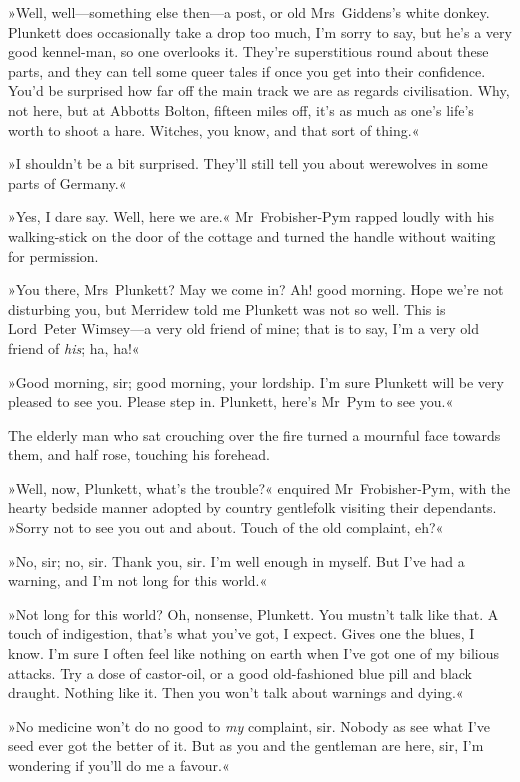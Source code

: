 »Well, well—something else then—a post, or old Mrs~Giddens's white donkey. Plunkett does occasionally take a drop too much, I'm sorry to say, but he's a very good kennel-man, so one overlooks it. They're superstitious round about these parts, and they can tell some queer tales if once you get into their confidence. You'd be surprised how far off the main track we are as regards civilisation. Why, not here, but at Abbotts Bolton, fifteen miles off, it's as much as one's life's worth to shoot a hare. Witches, you know, and that sort of thing.«

»I shouldn't be a bit surprised. They'll still tell you about werewolves in some parts of Germany.«

»Yes, I dare say. Well, here we are.« Mr~Frobisher-Pym rapped loudly with his walking-stick on the door of the cottage and turned the handle without waiting for permission.

»You there, Mrs~Plunkett? May we come in? Ah! good morning. Hope we're not disturbing you, but Merridew told me Plunkett was not so well. This is Lord~Peter Wimsey—a very old friend of mine; that is to say, I'm a very old friend of \textit{his}; ha, ha!«

»Good morning, sir; good morning, your lordship. I'm sure Plunkett will be very pleased to see you. Please step in. Plunkett, here's Mr~Pym to see you.«

The elderly man who sat crouching over the fire turned a mournful face towards them, and half rose, touching his forehead.

»Well, now, Plunkett, what's the trouble?« enquired Mr~Frobisher-Pym, with the hearty bedside manner adopted by country gentlefolk visiting their dependants. »Sorry not to see you out and about. Touch of the old complaint, eh?«

»No, sir; no, sir. Thank you, sir. I'm well enough in myself. But I've had a warning, and I'm not long for this world.«

»Not long for this world? Oh, nonsense, Plunkett. You mustn't talk like that. A touch of indigestion, that's what you've got, I expect. Gives one the blues, I know. I'm sure I often feel like nothing on earth when I've got one of my bilious attacks. Try a dose of castor-oil, or a good old-fashioned blue pill and black draught. Nothing like it. Then you won't talk about warnings and dying.«

»No medicine won't do no good to \textit{my} complaint, sir. Nobody as see what I've seed ever got the better of it. But as you and the gentleman are here, sir, I'm wondering if you'll do me a favour.«

